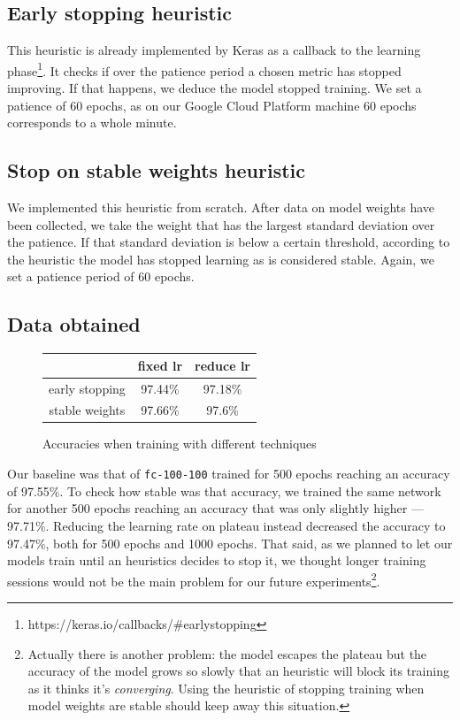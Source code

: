 \subsection{Early stopping heuristic}
This heuristic is already implemented by Keras as a callback to the
learning phase\footnote{https://keras.io/callbacks/\#earlystopping}. It
checks if over the patience period a chosen metric has stopped improving. If
that happens, we deduce the model stopped training. We set a patience of
60 epochs, as on our Google Cloud Platform machine 60 epochs corresponds
to a whole minute.

\subsection{Stop on stable weights heuristic}
We implemented this heuristic from scratch. After data on model weights
have been collected, we take the weight that has the largest standard
deviation over the patience. If that standard deviation is below a
certain threshold, according to the heuristic the model has stopped
learning as is considered stable. Again, we set a patience period of 60 epochs.

\subsection{Data obtained}

\begin{figure}
  \centering
  \begin{tabular}{|c|c|c|}
    \hline
    & fixed lr & reduce lr \\
    \hline
    early stopping & 97.44\% & 97.18\% \\
    \hline
    stable weights & 97.66\% & 97.6\% \\
    \hline
  \end{tabular}
  \caption{Accuracies when training with different techniques}
  \label{fig:accuracy-heuristics}
\end{figure}

Our baseline was that of \texttt{fc-100-100} trained for 500 epochs
reaching an accuracy of 97.55\%. To check how stable was that accuracy,
we trained the same network for another 500 epochs reaching an accuracy
that was only slightly higher --- 97.71\%. Reducing the learning rate
on plateau instead decreased the accuracy to 97.47\%, both for 500
epochs and 1000 epochs. That said, as we planned to let our models
train until an heuristics decides to stop it, we thought longer training
sessions would not be the main problem for our future
experiments\footnote{Actually there is another problem: the model
  escapes the plateau but the accuracy of the model grows so slowly
  that an heuristic will block its training as it thinks it's
  \emph{converging}. Using the heuristic of stopping training when
  model weights are stable should keep away this situation.}.

